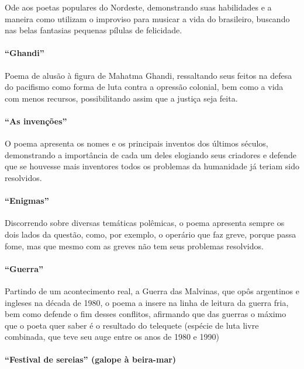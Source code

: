 Ode aos poetas populares do Nordeste, demonstrando suas habilidades e a
maneira como utilizam o improviso para musicar a vida do
brasileiro, buscando nas belas fantasias pequenas pílulas de
felicidade.

\paragraph{``Ghandi''}

Poema de alusão à figura de Mahatma Ghandi, ressaltando seus feitos na
defesa do pacifismo como forma de luta contra a opressão colonial, bem
como a vida com menos recursos, possibilitando assim que a justiça seja
feita.

\paragraph{``As invenções''}

O poema apresenta os nomes e os principais inventos dos últimos séculos,
demonstrando a importância de cada um deles elogiando seus criadores 
e defende que se houvesse mais inventores todos os
problemas da humanidade já teriam sido resolvidos.

\paragraph{``Enigmas''}

Discorrendo sobre diversas temáticas polêmicas, o poema apresenta sempre
os dois lados da questão, como, por exemplo, o operário que faz greve,
porque passa fome, mas que mesmo com as greves não tem seus problemas
resolvidos.

\paragraph{``Guerra''}

Partindo de um acontecimento real, a Guerra das Malvinas, que opôs
argentinos e ingleses na década de 1980, o poema a insere na linha de
leitura da guerra fria, bem como defende o fim desses conflitos,
afirmando que das guerras o máximo que o poeta quer saber é o resultado
do telequete (espécie de luta livre combinada, que teve seu auge entre
os anos de 1980 e 1990)

\paragraph{``Festival de sereias'' (galope à beira-mar)}

